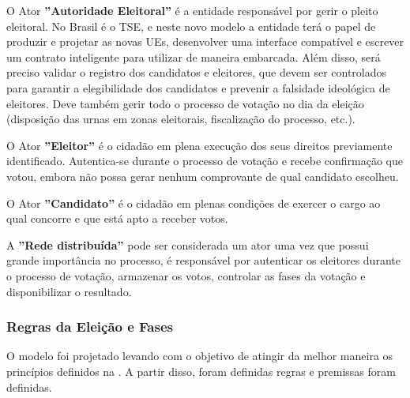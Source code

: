 \documentclass[portuguese]{textolivre}
\begin{document}
	O Ator \textbf{''Autoridade Eleitoral''} é a entidade responsável por gerir o pleito eleitoral. No Brasil é o TSE, e neste novo modelo a entidade terá o papel de produzir e projetar as novas UEs, desenvolver uma interface compatível e escrever um contrato inteligente para utilizar de maneira embarcada. Além disso, será preciso validar o registro dos candidatos e eleitores, que devem ser controlados para garantir a elegibilidade dos candidatos e prevenir a falsidade ideológica de eleitores. Deve também gerir todo o processo de votação no dia da eleição (disposição das urnas em zonas eleitorais, fiscalização do processo, etc.).
	
	O Ator \textbf{''Eleitor''} é o cidadão em plena execução dos seus direitos previamente identificado. Autentica-se durante o processo de votação e recebe confirmação que votou, embora não possa gerar nenhum comprovante de qual candidato escolheu.
	
	O Ator \textbf{''Candidato''} é o cidadão em plenas condições de exercer o cargo ao qual concorre e que está apto a receber votos.
	
	A \textbf{''Rede distribuída''} pode ser considerada um ator uma vez que possui grande importância no processo, é responsável por autenticar os eleitores durante o processo de votação, armazenar os votos, controlar as fases da votação e disponibilizar o resultado.%
	
	
	
	\subsubsection{Regras da Eleição e Fases}
	
	O modelo foi projetado levando com o objetivo de atingir da melhor maneira os princípios definidos na . A partir disso, foram definidas regras e premissas foram definidas. 
	
\end{document}
